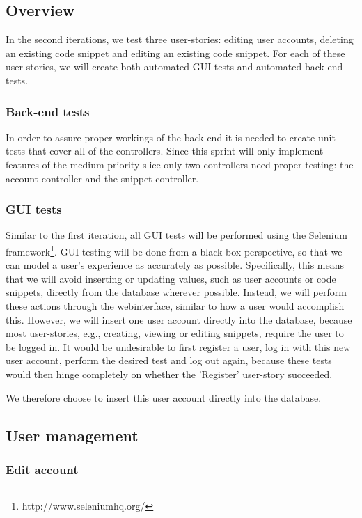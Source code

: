 \documentclass[10pt,a4paper,BCOR12mm, headexclude, footexclude,
  twoside, openright]{scrartcl}
\numberwithin{equation}{section} %
\numberwithin{figure}{section} %
\numberwithin{table}{section} %
\begin{document}
\subsection{Overview}
In the second iterations, we test three user-stories: editing user accounts, deleting an existing code snippet and editing an existing code snippet.
For each of these user-stories, we will create both automated GUI tests and automated back-end tests.

\subsubsection*{Back-end tests}
In order to assure proper workings of the back-end it is needed to create unit
tests that cover all of the controllers. Since this sprint will only implement
features of the medium priority slice only two controllers need proper testing:
the account controller and the snippet controller.

\subsubsection*{GUI tests}
Similar to the first iteration, all GUI tests will be performed using the Selenium framework\footnote{http://www.seleniumhq.org/}.
GUI testing will be done from a black-box perspective, so that we can model a user's experience as accurately as possible.
Specifically, this means that we will avoid inserting or updating values, such as user accounts or code snippets, directly from the database wherever possible.
Instead, we will perform these actions through the webinterface, similar to how a user would accomplish this.
However, we will insert one user account directly into the database, because most user-stories, e.g., creating, viewing or editing snippets, require the user to be logged in.
It would be undesirable to first register a user, log in with this new user account, perform the desired test and log out again, because these tests would then hinge completely on whether the 'Register' user-story succeeded.

We therefore choose to insert this user account directly into the database.

\subsection{User management}

\subsubsection*{Edit account}
\end{document}
